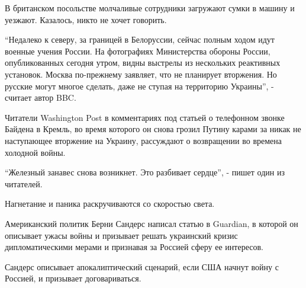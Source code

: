 \begin{multicols}{3}
В британском посольстве молчаливые сотрудники загружают сумки в машину и
уезжают. Казалось, никто не хочет говорить.

\enquote{Недалеко к северу, за границей в Белоруссии, сейчас полным ходом идут военные
учения России. На фотографиях Министерства обороны России, опубликованных
сегодня утром, видны выстрелы из нескольких реактивных установок. Москва
по-прежнему заявляет, что не планирует вторжения. Но русские могут многое
сделать, даже не ступая на территорию Украины}, - считает автор BBC.


Читатели Washington Post в комментариях под статьей о телефонном звонке Байдена
в Кремль, во время которого он снова грозил Путину карами за никак не
наступающее вторжение на Украину, рассуждают о возвращении во времена холодной
войны.

\enquote{Железный занавес снова возникнет. Это разбивает сердце}, - пишет один из читателей.

Нагнетание и паника раскручиваются со скоростью света.

Американский политик Берни Сандерс написал статью в Guardian, в которой он
описывает ужасы войны и призывает решать украинский кризис дипломатическими
мерами и признавая за Россией сферу ее интересов.

Сандерс описывает апокалиптический сценарий, если США начнут войну с Россией, и
призывает договариваться.


\end{multicols}
